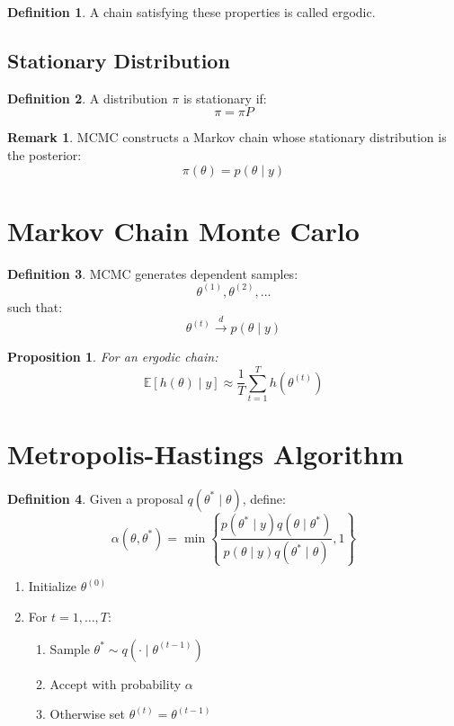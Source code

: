 \documentclass[12pt,oneside]{book}
\numberwithin{equation}{section}
\theoremstyle{definition}
\newtheorem{definition}{Definition}[section]
\newtheorem{remark}{Remark}[section]
\theoremstyle{plain}
\newtheorem{proposition}{Proposition}[section]
\theoremstyle{remark}
\newcommand{\E}{\mathbb{E}}
\begin{document}
\begin{definition}
A chain satisfying these properties is called ergodic.
\end{definition}

\subsection{Stationary Distribution}

\begin{definition}
A distribution $\pi$ is stationary if:
$$
\pi = \pi P
$$
\end{definition}

\begin{remark}
MCMC constructs a Markov chain whose stationary distribution is the posterior:
$$
\pi(\theta) = p(\theta \mid y)
$$
\end{remark}

\section{Markov Chain Monte Carlo}

\begin{definition}
MCMC generates dependent samples:
$$
\theta^{(1)}, \theta^{(2)}, \dots
$$
such that:
$$
\theta^{(t)} \xrightarrow{d} p(\theta \mid y)
$$
\end{definition}

\begin{proposition}
For an ergodic chain:
$$
\E[h(\theta) \mid y]
\approx
\frac{1}{T}\sum_{t=1}^T h(\theta^{(t)})
$$
\end{proposition}

\section{Metropolis-Hastings Algorithm}

\begin{definition}
Given a proposal $q(\theta^* \mid \theta)$, define:
$$
\alpha(\theta,\theta^*)
=
\min\left\{
\frac{p(\theta^* \mid y)q(\theta \mid \theta^*)}
{p(\theta \mid y)q(\theta^* \mid \theta)}, 1
\right\}
$$
\end{definition}

\begin{algorithm}
\begin{enumerate}
\item Initialize $\theta^{(0)}$
\item For $t=1,\dots,T$:
\begin{enumerate}
\item Sample $\theta^* \sim q(\cdot \mid \theta^{(t-1)})$
\item Accept with probability $\alpha$
\item Otherwise set $\theta^{(t)} = \theta^{(t-1)}$
\end{enumerate}
\end{enumerate}
\end{algorithm}
\end{document}
